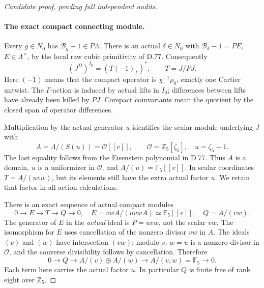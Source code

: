 \begin{proof}[Candidate proof, pending full independent audits]
\paragraph{The exact compact connecting module.}
Every \(g\in N_0\) has \(\mathcal B_g-1\in P\Lambda\).
There is an actual \(\delta\in N_0\) with
\(\mathcal B_\delta-1=P E\), \(E\in\Lambda^\times\),
by the local raw cubic primitivity of D.77. Consequently
\[
 (J^D)^{I_0}=(T(-1)_\Gamma)^*,\qquad T=J/PJ.            \tag{D.86.8}
\]
Here \((-1)\) means that the compact operator is
\(\chi^{-1}\rho_0\), exactly one Cartier untwist. The
\(\Gamma\)-action is induced by actual lifts in \(I_0\);
differences between lifts have already been killed by \(PJ\).
Compact coinvariants mean the quotient by the closed span of
operator differences.

Multiplication by the actual generator \(u\) identifies the
scalar module underlying \(J\) with
\[
             A=\Lambda/(S(u))=\mathcal O[[v]],
             \qquad \mathcal O=\mathbb Z_5[\zeta_5],
             \quad u=\zeta_5-1.                       \tag{D.86.9}
\]
The last equality follows from the Eisenstein polynomial in
D.77. Thus \(A\) is a domain, \(u\) is a uniformizer in
\(\mathcal O\), and \(A/(u)=\mathbb F_5[[v]]\).
In scalar coordinates \(T=A/(uvw)\), but its elements still
have the extra actual factor \(u\). We retain that factor in
all action calculations.

There is an exact sequence of actual compact modules
\[
 0\longrightarrow E\longrightarrow T\longrightarrow Q
       \longrightarrow0,
 \quad E=vwA/(uvwA)\simeq\mathbb F_5[[v]],
 \quad Q=A/(vw).                                      \tag{D.86.10}
\]
The generator of \(E\) in the \emph{actual} ideal is \(P=uvw\),
not the scalar \(vw\). The isomorphism for \(E\) uses
cancellation of the nonzero divisor \(vw\) in \(A\).
The ideals \((v)\) and \((w)\) have intersection \((vw)\):
modulo \(v\), \(w=u\) is a nonzero divisor in \(\mathcal O\),
and the converse divisibility follows by cancellation.
Therefore
\[
 0\longrightarrow Q\longrightarrow A/(v)\oplus A/(w)
       \longrightarrow A/(v,w)=\mathbb F_5\longrightarrow0.
                                                               \tag{D.86.11}
\]
Each term here carries the actual factor \(u\). In particular
\(Q\) is finite free of rank eight over \(\mathbb Z_5\).


\end{proof}
